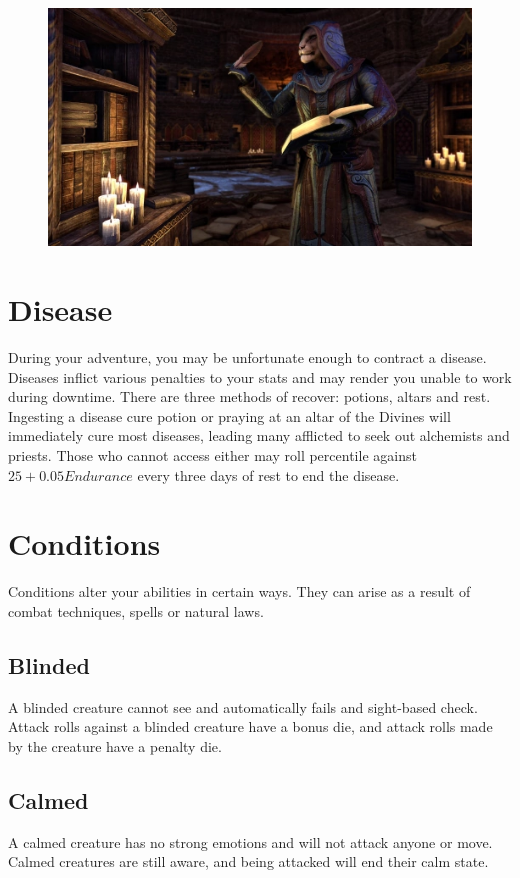 \documentclass[12pt]{book}
\begin{document}
\begin{figure}[H]
	\includegraphics[width=\textwidth]{scholar.png}
\end{figure}

\section{Disease}
During your adventure, you may be unfortunate enough to contract a disease. Diseases inflict various penalties to your stats and may render you unable to work during downtime. There are three methods of recover: potions, altars and rest. Ingesting a disease cure potion or praying at an altar of the Divines will immediately cure most diseases, leading many afflicted to seek out alchemists and priests. Those who cannot access either may roll percentile against $25+0.05Endurance$ every three days of rest to end the disease.

\section{Conditions}
Conditions alter your abilities in certain ways. They can arise as a result of combat techniques, spells or natural laws.

\subsection{Blinded}
A blinded creature cannot see and automatically fails and sight-based check. Attack rolls against a blinded creature have a bonus die, and attack rolls made by the creature have a penalty die.

\subsection{Calmed}
A calmed creature has no strong emotions and will not attack anyone or move. Calmed creatures are still aware, and being attacked will end their calm state.
\end{document}
